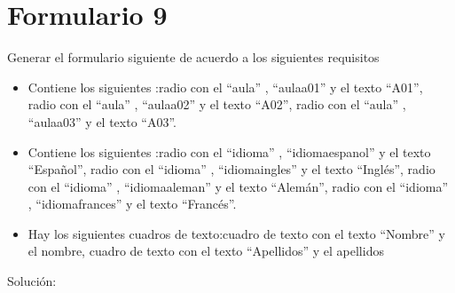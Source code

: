 \documentclass[letterpaper,10pt,spanish]{sphinxmanual}
\begin{document}
\section{Formulario 9}
\label{ejercicios/formularios/anexo_formularios:formulario-9}
Generar el formulario siguiente de acuerdo a los siguientes requisitos
\begin{itemize}
\item {} 
Contiene los siguientes :radio con el   ``aula'' ,   ``aulaa01''  y el texto ``A01'', radio con el   ``aula'' ,   ``aulaa02''  y el texto ``A02'', radio con el   ``aula'' ,   ``aulaa03''  y el texto ``A03''.

\item {} 
Contiene los siguientes :radio con el   ``idioma'' ,   ``idiomaespanol''  y el texto ``Español'', radio con el   ``idioma'' ,   ``idiomaingles''  y el texto ``Inglés'', radio con el   ``idioma'' ,   ``idiomaaleman''  y el texto ``Alemán'', radio con el   ``idioma'' ,   ``idiomafrances''  y el texto ``Francés''.

\item {} 
Hay los siguientes cuadros de texto:cuadro de texto con el texto ``Nombre'' y el  nombre, cuadro de texto con el texto ``Apellidos'' y el  apellidos

\end{itemize}


Solución:
\end{document}
